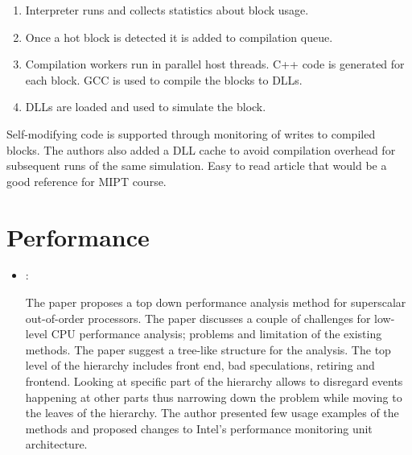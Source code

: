 \begin{itemize}
    \begin{enumerate}
        \item Interpreter runs and collects statistics about block usage.
        \item Once a hot block is detected it is added to compilation queue.
        \item Compilation workers run in parallel host threads. C++ code is generated for each block. GCC is used to compile the blocks to DLLs.
        \item DLLs are loaded and used to simulate the block.
    \end{enumerate}

    Self-modifying code is supported through monitoring of writes to compiled blocks. The authors also added a DLL cache to avoid compilation overhead for subsequent runs of the same simulation. Easy to read article that would be a good reference for  MIPT course.
\end{itemize}

\section*{Performance}
\begin{itemize}
    \item \cite{Yasin:TopDownCPUPerfAnalysis:2014}:

    The paper proposes a top down performance analysis method for superscalar out-of-order processors. The paper discusses a couple of challenges for low-level CPU performance analysis; problems and limitation of the existing methods. The paper suggest a tree-like structure for the analysis. The top level of the hierarchy includes front end, bad speculations, retiring and frontend. Looking at specific part of the hierarchy allows to disregard events happening at other parts thus narrowing down the problem while moving to the leaves of the hierarchy. The author presented few usage examples of the methods and proposed changes to Intel's performance monitoring unit architecture.
\end{itemize}

